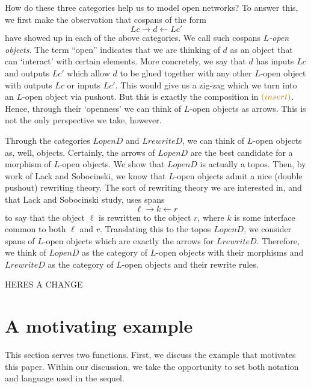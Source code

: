 \documentclass[]{amsart}
\newcommand{\edit}[1]{\textcolor{editcolour}{(#1)}}
\theoremstyle{remark}
\theoremstyle{definition}
\begin{document}
How do these three categories help
us to model open networks?
To answer this, we first make the
observation that cospans of the form
\[
Lc \to d \gets Lc'
\]
have showed up in each of the above
categories. We call such cospans
\emph{$L$-open objects}.  The term ``open''
indicates that we are thinking of $d$ as 
an object that can `interact' with certain 
elements. More concretely, we say that $ d $ 
has inputs $Lc$ and outputs $ Lc' $ which allow
$ d $ to be glued together with any other
$ L $-open object with outputs $ Lc $ or 
inputs $ Lc' $.  This would give us a zig-zag
which we turn into an $ L $-open object
via pushout.  But this is exactly the composition
in $ \edit{insert} $. Hence, through their `openness' 
we can think of $ L $-open objects as arrows.
This is not the only perspective we take, however.

Through the categories $ LopenD $ and $ LrewriteD $,
we can think of $ L $-open objects as, well, objects.
Certainly, the arrows of $ LopenD $ are the best
candidate for a morphism of $ L $-open objects.  
We show that $ LopenD $ is actually a topos.
Then, by work of Lack and Sobocinski, we know that
$ L $-open objects admit a nice (double pushout)
rewriting theory. The sort of rewriting theory we are
interested in, and that Lack and Sobocinski study,
uses spans 
\[
\ell \to k \gets r
\]
to say that the object $ \ell $ is
rewritten to the object $ r $, where $ k $
is some interface common to both 
$ \ell $ and $ r $.  Translating this to the topos 
$ LopenD $, we consider spans of $ L $-open objects
which are exactly the arrows for $ LrewriteD $.
Therefore, we think of $ LopenD $ as the
category of $ L $-open objects with their
morphisms and $ LrewriteD $ as the category
of $ L $-open objects and their rewrite rules.  

HERES A CHANGE


\section{A motivating example} \label{sec:motivating-example}

This section serves two functions. First, we discuss the example that motivates this paper.  Within our discussion, we take the opportunity to set both notation and language used in the sequel.  
\end{document}
